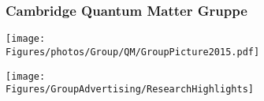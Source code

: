 
\begin{frame}[plain,label=Group]
\frametitle {Cambridge Quantum Matter Gruppe}
\centerline{\hspace{5em}\texttt{[image: \\Figures/photos/Group/QM/GroupPicture2015.pdf]}}
\end{frame}

\begin{frame}[label=ResearchHighlights]
\centerline{\texttt{[image: \\Figures/GroupAdvertising/ResearchHighlights]}}
\encbox


\end{frame}

